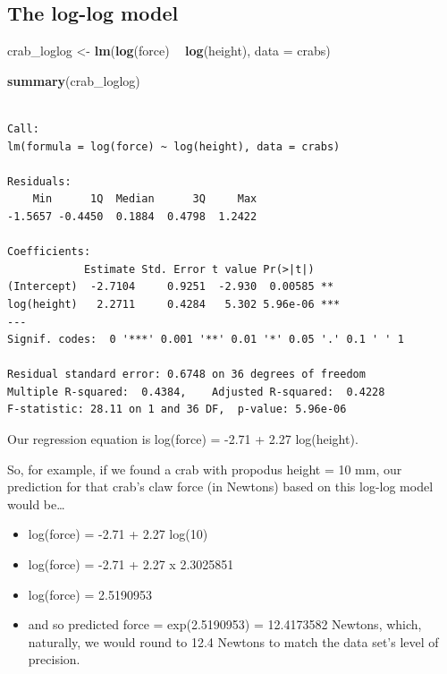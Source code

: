 \documentclass[
]{book}
\newenvironment{Shaded}{\begin{snugshade}}{\end{snugshade}}
\newcommand{\DataTypeTok}[1]{\textcolor[rgb]{0.13,0.29,0.53}{#1}}
\newcommand{\KeywordTok}[1]{\textcolor[rgb]{0.13,0.29,0.53}{\textbf{#1}}}
\newcommand{\NormalTok}[1]{#1}
\newcommand{\OperatorTok}[1]{\textcolor[rgb]{0.81,0.36,0.00}{\textbf{#1}}}
\newcommand{\StringTok}[1]{\textcolor[rgb]{0.31,0.60,0.02}{#1}}
\providecommand{\tightlist}{%
  \setlength{\itemsep}{0pt}\setlength{\parskip}{0pt}}
\begin{document}
\hypertarget{the-log-log-model}{%
\subsection{The log-log model}\label{the-log-log-model}}

\begin{Shaded}
\begin{Highlighting}[]
\NormalTok{crab_loglog <-}\StringTok{ }\KeywordTok{lm}\NormalTok{(}\KeywordTok{log}\NormalTok{(force) }\OperatorTok{~}\StringTok{ }\KeywordTok{log}\NormalTok{(height), }\DataTypeTok{data =}\NormalTok{ crabs)}

\KeywordTok{summary}\NormalTok{(crab_loglog)}
\end{Highlighting}
\end{Shaded}

\begin{verbatim}

Call:
lm(formula = log(force) ~ log(height), data = crabs)

Residuals:
    Min      1Q  Median      3Q     Max 
-1.5657 -0.4450  0.1884  0.4798  1.2422 

Coefficients:
            Estimate Std. Error t value Pr(>|t|)    
(Intercept)  -2.7104     0.9251  -2.930  0.00585 ** 
log(height)   2.2711     0.4284   5.302 5.96e-06 ***
---
Signif. codes:  0 '***' 0.001 '**' 0.01 '*' 0.05 '.' 0.1 ' ' 1

Residual standard error: 0.6748 on 36 degrees of freedom
Multiple R-squared:  0.4384,	Adjusted R-squared:  0.4228 
F-statistic: 28.11 on 1 and 36 DF,  p-value: 5.96e-06
\end{verbatim}

Our regression equation is log(force) = -2.71 + 2.27 log(height).

So, for example, if we found a crab with propodus height = 10 mm, our prediction for that crab's claw force (in Newtons) based on this log-log model would be\ldots{}

\begin{itemize}
\tightlist
\item
  log(force) = -2.71 + 2.27 log(10)
\item
  log(force) = -2.71 + 2.27 x 2.3025851
\item
  log(force) = 2.5190953
\item
  and so predicted force = exp(2.5190953) = 12.4173582 Newtons, which, naturally, we would round to 12.4 Newtons to match the data set's level of precision.
\end{itemize}
\end{document}

